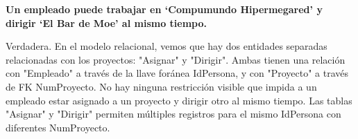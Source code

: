\textbf{Un empleado puede trabajar en ‘Compumundo Hipermegared’ y dirigir ‘El Bar de Moe’ al mismo tiempo.}\vspace{.3cm}

Verdadera. En el modelo relacional, vemos que hay dos entidades separadas relacionadas con los proyectos: "Asignar" y "Dirigir". Ambas tienen una relación con "Empleado" a través de la llave foránea IdPersona, y con "Proyecto" a través de FK NumProyecto. No hay ninguna restricción visible que impida a un empleado estar asignado a un proyecto y dirigir otro al mismo tiempo. Las tablas "Asignar" y "Dirigir" permiten múltiples registros para el mismo IdPersona con diferentes NumProyecto.